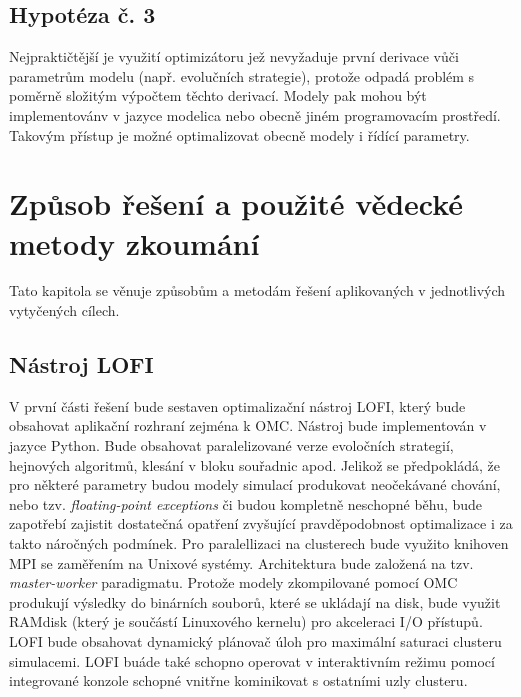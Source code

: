 \section*{Hypotéza č. 3}
Nejpraktičtější je využití optimizátoru jež nevyžaduje první derivace vůči
parametrům modelu (např. evolučních strategie), protože odpadá problém s
poměrně složitým výpočtem těchto derivací. Modely pak mohou být implementovánv
v jazyce modelica nebo obecně jiném programovacím prostředí. Takovým přístup je
možné optimalizovat obecně modely i řídící parametry.
\chapter{Způsob řešení a použité vědecké metody zkoumání}
Tato kapitola se věnuje způsobům a metodám řešení aplikovaných v jednotlivých
vytyčených cílech.
\section{Nástroj LOFI}
\label{sec:tool_LOFI}
V první části řešení bude sestaven optimalizační nástroj LOFI, který bude
obsahovat aplikační rozhraní zejména k OMC. Nástroj bude implementován v jazyce
Python. Bude obsahovat paralelizované verze evoločních strategií, hejnových
algoritmů, klesání v bloku souřadnic apod. Jelikož se předpokládá, že pro
některé parametry budou modely simulací produkovat neočekávané chování, nebo
tzv. \textit{floating-point exceptions} či budou kompletně neschopné běhu, bude
zapotřebí zajistit dostatečná opatření zvyšující pravděpodobnost optimalizace i
za takto náročných podmínek. Pro paralellizaci na clusterech bude využito
knihoven MPI se zaměřením na Unixové systémy. Architektura bude založená na
tzv. \textit{master-worker} paradigmatu. Protože modely zkompilované
pomocí OMC produkují výsledky do binárních souborů, které se ukládají na disk,
bude využit RAMdisk (který je součástí Linuxového kernelu) pro akceleraci I/O
přístupů. LOFI bude obsahovat dynamický plánovač úloh pro maximální saturaci
clusteru simulacemi. LOFI buáde také schopno operovat v interaktivním režimu
pomocí integrované konzole schopné vnitřne kominikovat s ostatními uzly
clusteru.



